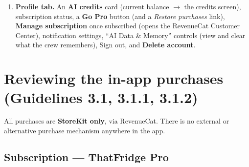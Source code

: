 \documentclass[11pt]{article}
\begin{document}
\begin{enumerate}
        approve join requests. Content in a fridge is visible only to approved members.
        Hosting a shared fridge requires Pro; being invited to one is free. The demo account
        has Pro, so all of this is available.
  \item \textbf{Profile tab.} An \textbf{AI credits} card (current balance $\rightarrow$
        the credits screen), subscription status, a \textbf{Go Pro} button (and a
        \emph{Restore purchases} link), \textbf{Manage subscription} once subscribed (opens
        the RevenueCat Customer Center), notification settings, ``AI Data \& Memory''
        controls (view and clear what the crew remembers), Sign out, and \textbf{Delete
        account}.
\end{enumerate}

\section{Reviewing the in-app purchases (Guidelines 3.1, 3.1.1, 3.1.2)}
\label{sec:iap}

All purchases are \textbf{StoreKit only}, via RevenueCat. There is no external or
alternative purchase mechanism anywhere in the app.

\subsection{Subscription --- ThatFridge Pro}
\end{document}
